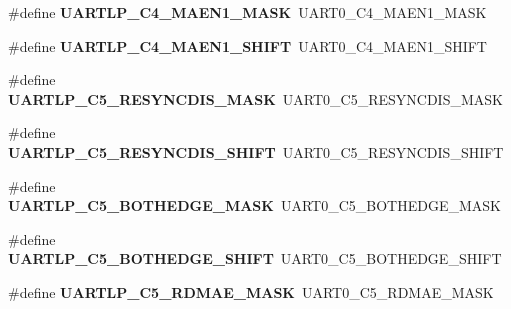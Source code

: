 \begin{DoxyCompactItemize}
\#define {\bfseries U\+A\+R\+T\+L\+P\+\_\+\+C4\+\_\+\+M\+A\+E\+N1\+\_\+\+M\+A\+SK}~U\+A\+R\+T0\+\_\+\+C4\+\_\+\+M\+A\+E\+N1\+\_\+\+M\+A\+SK
\item 
\mbox{\label{group___backward___compatibility___symbols_ga0c83ed1dac8e50a43d52747f42b80a3d}} 
\#define {\bfseries U\+A\+R\+T\+L\+P\+\_\+\+C4\+\_\+\+M\+A\+E\+N1\+\_\+\+S\+H\+I\+FT}~U\+A\+R\+T0\+\_\+\+C4\+\_\+\+M\+A\+E\+N1\+\_\+\+S\+H\+I\+FT
\item 
\mbox{\label{group___backward___compatibility___symbols_ga6c8f73a689a6c4d5d7425325b8c3bde2}} 
\#define {\bfseries U\+A\+R\+T\+L\+P\+\_\+\+C5\+\_\+\+R\+E\+S\+Y\+N\+C\+D\+I\+S\+\_\+\+M\+A\+SK}~U\+A\+R\+T0\+\_\+\+C5\+\_\+\+R\+E\+S\+Y\+N\+C\+D\+I\+S\+\_\+\+M\+A\+SK
\item 
\mbox{\label{group___backward___compatibility___symbols_gaff26147c2d7f8a45ddaa3d4ecb42343d}} 
\#define {\bfseries U\+A\+R\+T\+L\+P\+\_\+\+C5\+\_\+\+R\+E\+S\+Y\+N\+C\+D\+I\+S\+\_\+\+S\+H\+I\+FT}~U\+A\+R\+T0\+\_\+\+C5\+\_\+\+R\+E\+S\+Y\+N\+C\+D\+I\+S\+\_\+\+S\+H\+I\+FT
\item 
\mbox{\label{group___backward___compatibility___symbols_ga6b248448b3fc7bf345c7a75bec3b8aa3}} 
\#define {\bfseries U\+A\+R\+T\+L\+P\+\_\+\+C5\+\_\+\+B\+O\+T\+H\+E\+D\+G\+E\+\_\+\+M\+A\+SK}~U\+A\+R\+T0\+\_\+\+C5\+\_\+\+B\+O\+T\+H\+E\+D\+G\+E\+\_\+\+M\+A\+SK
\item 
\mbox{\label{group___backward___compatibility___symbols_gac6b4dfae8e6dc532807323db5e2e489c}} 
\#define {\bfseries U\+A\+R\+T\+L\+P\+\_\+\+C5\+\_\+\+B\+O\+T\+H\+E\+D\+G\+E\+\_\+\+S\+H\+I\+FT}~U\+A\+R\+T0\+\_\+\+C5\+\_\+\+B\+O\+T\+H\+E\+D\+G\+E\+\_\+\+S\+H\+I\+FT
\item 
\mbox{\label{group___backward___compatibility___symbols_ga8b81dfd26f766f55a3c80110e5439652}} 
\#define {\bfseries U\+A\+R\+T\+L\+P\+\_\+\+C5\+\_\+\+R\+D\+M\+A\+E\+\_\+\+M\+A\+SK}~U\+A\+R\+T0\+\_\+\+C5\+\_\+\+R\+D\+M\+A\+E\+\_\+\+M\+A\+SK
\item 
\mbox{\label{group___backward___compatibility___symbols_gabf5bb3ff2b944bfdbfd8b05f29c7b678}} 

\end{DoxyCompactItemize}
